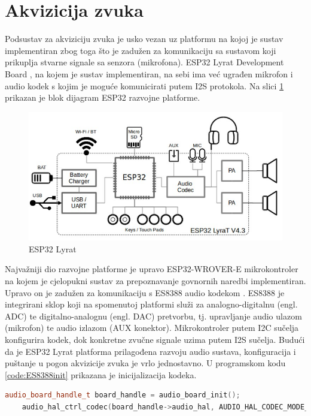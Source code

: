 \section{Akvizicija zvuka}
\label{sec:acq}

Podsustav za akviziciju zvuka je usko vezan uz platformu na kojoj
je sustav implementiran zbog toga što je zadužen za komunikaciju 
sa sustavom koji prikuplja stvarne signale sa senzora (mikrofona).
ESP32 Lyrat Development Board \cite{lyrat}, na kojem je sustav
implementiran, na sebi ima već ugrađen mikrofon i audio kodek
s kojim je moguće komunicirati putem I2S protokola. Na slici
\ref{pic:esp} prikazan je blok dijagram ESP32 razvojne platforme.

\begin{figure}[htb]
    \centering
    \includegraphics[width=0.6\linewidth]{Chapters/struktura_sustava/akvizicija/lyrat.png} 
    \caption{ESP32 Lyrat \cite{lyrat}}
    \label{pic:esp}
\end{figure}

Najvažniji dio razvojne platforme je upravo ESP32-WROVER-E mikrokontroler
na kojem je cjelopukni sustav za prepoznavanje govnornih naredbi 
implementiran. Upravo on je zadužen za komunikaciju s ES8388 
audio kodekom \cite{es8388}. ES8388 je integrirani sklop koji na spomenutoj
platformi služi za analogno-digitalnu (engl. ADC) te digitalno-analognu 
(engl. DAC) pretvorbu, tj. upravljanje audio ulazom (mikrofon) te audio
izlazom (AUX konektor). Mikrokontroler putem I2C sučelja konfigurira kodek,
dok konkretne zvučne signale uzima putem I2S sučelja. Budući da je ESP32 Lyrat
platforma prilagođena razvoju audio sustava, konfiguracija i puštanje u pogon
akvizicije zvuka je vrlo jednostavno. U programskom kodu \ref{code:ES8388init}
prikazana je inicijalizacija kodeka.\\

\begin{lstlisting}[language=C++, caption=Inicijalizacija kodeka]
    audio_board_handle_t board_handle = audio_board_init();
    audio_hal_ctrl_codec(board_handle->audio_hal, AUDIO_HAL_CODEC_MODE_ENCODE, AUDIO_HAL_CTRL_START);
\end{lstlisting}
\label{code:ES8388init}

